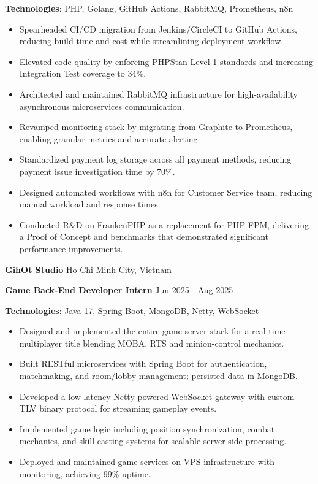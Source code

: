 \documentclass[10pt]{article}
\begin{document}
\textbf{Technologies}: PHP, Golang, GitHub Actions, RabbitMQ, Prometheus, n8n
\begin{itemize}[nosep, leftmargin=*]
    \item Spearheaded CI/CD migration from Jenkins/CircleCI to GitHub Actions, reducing build time and cost while streamlining deployment workflow.
    \item Elevated code quality by enforcing PHPStan Level 1 standards and increasing Integration Test coverage to 34\%.
    \item Architected and maintained RabbitMQ infrastructure for high-availability asynchronous microservices communication.
    \item Revamped monitoring stack by migrating from Graphite to Prometheus, enabling granular metrics and accurate alerting.
    \item Standardized payment log storage across all payment methods, reducing payment issue investigation time by 70\%.
    \item Designed automated workflows with n8n for Customer Service team, reducing manual workload and response times.
    \item Conducted R\&D on FrankenPHP as a replacement for PHP-FPM, delivering a Proof of Concept and benchmarks that demonstrated significant performance improvements.
\end{itemize}

\vspace{4pt}

\textbf{GihOt Studio} \hfill Ho Chi Minh City, Vietnam

\textbf{Game Back-End Developer Intern} \hfill Jun 2025 - Aug 2025

\textbf{Technologies}: Java 17, Spring Boot, MongoDB, Netty, WebSocket
\begin{itemize}[nosep, leftmargin=*]
    \item Designed and implemented the entire game-server stack for a real-time multiplayer title blending MOBA, RTS and minion-control mechanics.
    \item Built RESTful microservices with Spring Boot for authentication, matchmaking, and room/lobby management; persisted data in MongoDB.
    \item Developed a low-latency Netty-powered WebSocket gateway with custom TLV binary protocol for streaming gameplay events.
    \item Implemented game logic including position synchronization, combat mechanics, and skill-casting systems for scalable server-side processing.
    \item Deployed and maintained game services on VPS infrastructure with monitoring, achieving 99\% uptime.
\end{itemize}
\end{document}
